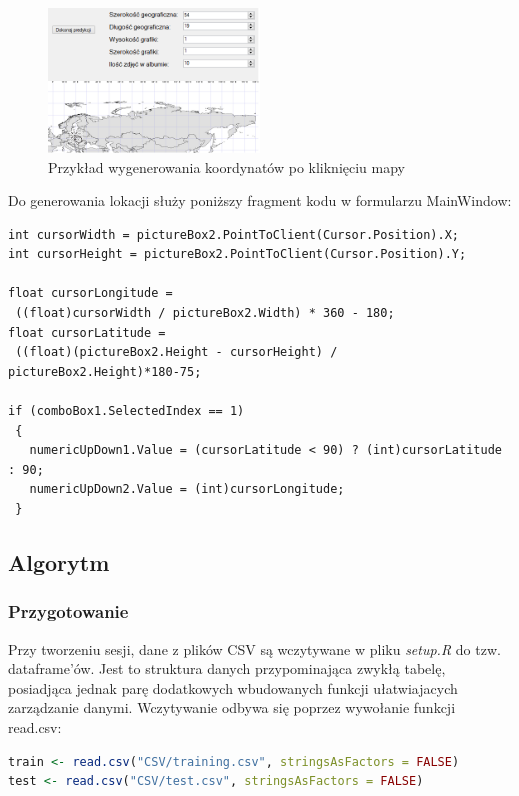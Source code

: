 \documentclass[a4paper,twoside]{article}
\begin{document}
\newpage

\begin{figure}[h!]
	\centering
	\includegraphics[width=0.5\textwidth]{./img/05.png}
	\caption{Przykład wygenerowania koordynatów po kliknięciu mapy}
\end{figure}

Do generowania lokacji służy poniższy fragment kodu w formularzu MainWindow:

\lstset{style=sharpc}
\begin{lstlisting}
int cursorWidth = pictureBox2.PointToClient(Cursor.Position).X;
int cursorHeight = pictureBox2.PointToClient(Cursor.Position).Y;

float cursorLongitude =
 ((float)cursorWidth / pictureBox2.Width) * 360 - 180;
float cursorLatitude =
 ((float)(pictureBox2.Height - cursorHeight) / pictureBox2.Height)*180-75;

if (comboBox1.SelectedIndex == 1)
 {
   numericUpDown1.Value = (cursorLatitude < 90) ? (int)cursorLatitude : 90;
   numericUpDown2.Value = (int)cursorLongitude;
 }
\end{lstlisting}

\subsection{Algorytm}

\subsubsection{Przygotowanie}

Przy tworzeniu sesji, dane z plików CSV są wczytywane w pliku \textit{setup.R} do tzw. dataframe'ów. Jest to struktura danych przypominająca zwykłą tabelę, posiadjąca jednak parę dodatkowych wbudowanych funkcji ułatwiajacych zarządzanie danymi. Wczytywanie odbywa się poprzez wywołanie funkcji read.csv:

\begin{lstlisting}[language=R]
train <- read.csv("CSV/training.csv", stringsAsFactors = FALSE)
test <- read.csv("CSV/test.csv", stringsAsFactors = FALSE)
\end{lstlisting}
\end{document}

